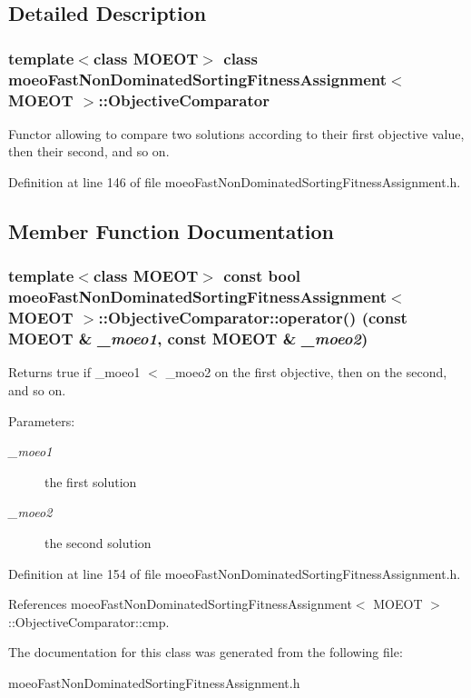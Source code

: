 \subsection{Detailed Description}
\subsubsection*{template$<$class MOEOT$>$ class moeo\-Fast\-Non\-Dominated\-Sorting\-Fitness\-Assignment$<$ MOEOT $>$::Objective\-Comparator}

Functor allowing to compare two solutions according to their first objective value, then their second, and so on. 



Definition at line 146 of file moeo\-Fast\-Non\-Dominated\-Sorting\-Fitness\-Assignment.h.

\subsection{Member Function Documentation}
\subsubsection{\setlength{\rightskip}{0pt plus 5cm}template$<$class MOEOT$>$ const bool \bf{moeo\-Fast\-Non\-Dominated\-Sorting\-Fitness\-Assignment}$<$ MOEOT $>$::Objective\-Comparator::operator() (const MOEOT \& {\em \_\-moeo1}, const MOEOT \& {\em \_\-moeo2})\hspace{0.3cm}{\tt  [inline]}}\label{classmoeoFastNonDominatedSortingFitnessAssignment_1_1ObjectiveComparator_21ba1645a166a348a24c204e88f97987}


Returns true if \_\-moeo1 $<$ \_\-moeo2 on the first objective, then on the second, and so on. 

\begin{Desc}
\item[Parameters:]
\begin{description}
\item[{\em \_\-moeo1}]the first solution \item[{\em \_\-moeo2}]the second solution \end{description}
\end{Desc}


Definition at line 154 of file moeo\-Fast\-Non\-Dominated\-Sorting\-Fitness\-Assignment.h.

References moeo\-Fast\-Non\-Dominated\-Sorting\-Fitness\-Assignment$<$ MOEOT $>$::Objective\-Comparator::cmp.

The documentation for this class was generated from the following file:\begin{CompactItemize}
\item 
moeo\-Fast\-Non\-Dominated\-Sorting\-Fitness\-Assignment.h\end{CompactItemize}
